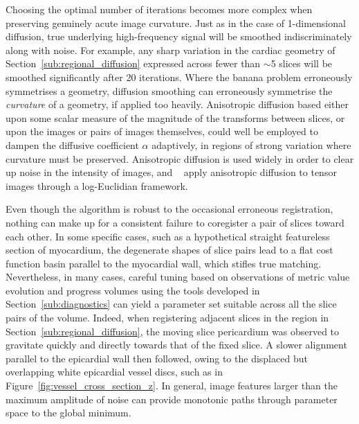   Choosing the optimal number of iterations becomes more complex when preserving genuinely acute image curvature. Just as in the case of 1-dimensional diffusion, true underlying high-frequency signal will be smoothed indiscriminately along with noise. For example, any sharp variation in the cardiac geometry of Section~\ref{sub:regional_diffusion} expressed across fewer than $\sim$5 slices will be smoothed significantly after 20 iterations. Where the banana problem erroneously symmetrises a geometry, diffusion smoothing can erroneously symmetrise the \emph{curvature} of a geometry, if applied too heavily. Anisotropic diffusion based either upon some scalar measure of the magnitude of the transforms between slices, or upon the images or pairs of images themselves, could well be employed to dampen the diffusive coefficient $\alpha$ adaptively, in regions of strong variation where curvature must be preserved. Anisotropic diffusion is used widely in order to clear up noise in the intensity of images, and ~\cite{Arsigny2005} apply anisotropic diffusion to tensor images through a log-Euclidian framework.
  
  Even though the algorithm is robust to the occasional erroneous registration, nothing can make up for a consistent failure to coregister a pair of slices toward each other. In some specific cases, such as a hypothetical straight featureless section of myocardium, the degenerate shapes of slice pairs lead to a flat cost function basin parallel to the myocardial wall, which stifles true matching. Nevertheless, in many cases, careful tuning based on observations of metric value evolution and progress volumes using the tools developed in Section~\ref{sub:diagnostics} can yield a parameter set suitable across all the slice pairs of the volume. Indeed, when registering adjacent slices in the region in Section~\ref{sub:regional_diffusion}, the moving slice pericardium was observed to gravitate quickly and directly towards that of the fixed slice. A slower alignment parallel to the epicardial wall then followed, owing to the displaced but overlapping white epicardial vessel discs, such as in Figure~\ref{fig:vessel_cross_section_z}. In general, image features larger than the maximum amplitude of noise can provide monotonic paths through parameter space to the global minimum.
  

